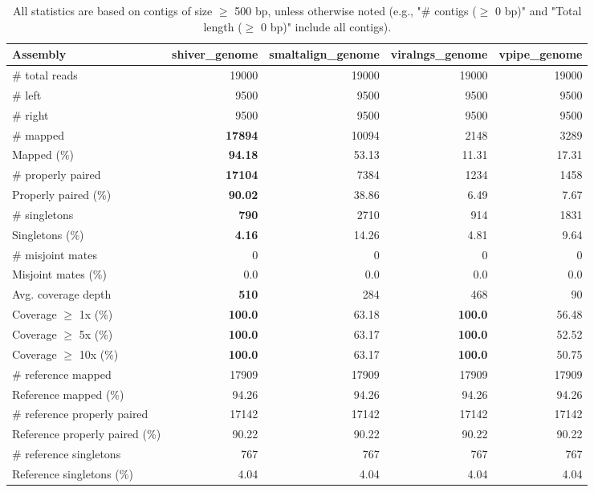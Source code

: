 \documentclass[12pt,a4paper]{article}
\begin{document}
\begin{table}[ht]
\begin{center}
\caption{All statistics are based on contigs of size $\geq$ 500 bp, unless otherwise noted (e.g., "\# contigs ($\geq$ 0 bp)" and "Total length ($\geq$ 0 bp)" include all contigs).}
\begin{tabular}{|l*{4}{|r}|}
\hline
Assembly & shiver\_genome & smaltalign\_genome & viralngs\_genome & vpipe\_genome \\ \hline
\# total reads & 19000 & 19000 & 19000 & 19000 \\ \hline
\# left & 9500 & 9500 & 9500 & 9500 \\ \hline
\# right & 9500 & 9500 & 9500 & 9500 \\ \hline
\# mapped & {\bf 17894} & 10094 & 2148 & 3289 \\ \hline
Mapped (\%) & {\bf 94.18} & 53.13 & 11.31 & 17.31 \\ \hline
\# properly paired & {\bf 17104} & 7384 & 1234 & 1458 \\ \hline
Properly paired (\%) & {\bf 90.02} & 38.86 & 6.49 & 7.67 \\ \hline
\# singletons & {\bf 790} & 2710 & 914 & 1831 \\ \hline
Singletons (\%) & {\bf 4.16} & 14.26 & 4.81 & 9.64 \\ \hline
\# misjoint mates & 0 & 0 & 0 & 0 \\ \hline
Misjoint mates (\%) & 0.0 & 0.0 & 0.0 & 0.0 \\ \hline
Avg. coverage depth & {\bf 510} & 284 & 468 & 90 \\ \hline
Coverage $\geq$ 1x (\%) & {\bf 100.0} & 63.18 & {\bf 100.0} & 56.48 \\ \hline
Coverage $\geq$ 5x (\%) & {\bf 100.0} & 63.17 & {\bf 100.0} & 52.52 \\ \hline
Coverage $\geq$ 10x (\%) & {\bf 100.0} & 63.17 & {\bf 100.0} & 50.75 \\ \hline
\# reference mapped & 17909 & 17909 & 17909 & 17909 \\ \hline
Reference mapped (\%) & 94.26 & 94.26 & 94.26 & 94.26 \\ \hline
\# reference properly paired & 17142 & 17142 & 17142 & 17142 \\ \hline
Reference properly paired (\%) & 90.22 & 90.22 & 90.22 & 90.22 \\ \hline
\# reference singletons & 767 & 767 & 767 & 767 \\ \hline
Reference singletons (\%) & 4.04 & 4.04 & 4.04 & 4.04 \\ \hline

\end{tabular}
\end{center}
\end{table}
\end{document}
